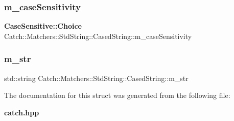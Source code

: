 \subsubsection{m\+\_\+case\+Sensitivity}
{\footnotesize\ttfamily \textbf{ Case\+Sensitive\+::\+Choice} Catch\+::\+Matchers\+::\+Std\+String\+::\+Cased\+String\+::m\+\_\+case\+Sensitivity}

\mbox{\label{struct_catch_1_1_matchers_1_1_std_string_1_1_cased_string_ad05dbc99aba3c3c386d6b856b213f911}} 
\subsubsection{m\+\_\+str}
{\footnotesize\ttfamily std\+::string Catch\+::\+Matchers\+::\+Std\+String\+::\+Cased\+String\+::m\+\_\+str}



The documentation for this struct was generated from the following file\+:\begin{DoxyCompactItemize}
\item 
\textbf{ catch.\+hpp}\end{DoxyCompactItemize}

